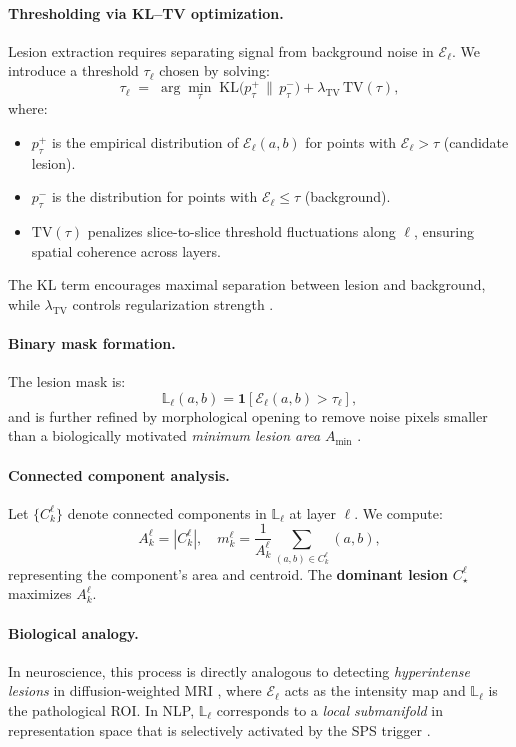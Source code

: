 \documentclass[11pt]{article}
\begin{document}
\paragraph{Thresholding via KL–TV optimization.}
Lesion extraction requires separating signal from background noise in $\mathcal{E}_\ell$.  
We introduce a threshold $\tau_\ell$ chosen by solving:
\[
\tau_\ell \;=\; \arg\min_{\tau} \; \mathrm{KL}\big(p^+_\tau \,\|\, p^-_\tau\big) + \lambda_{\mathrm{TV}}\, \mathrm{TV}(\tau),
\]
where:
\begin{itemize}
    \item $p^+_\tau$ is the empirical distribution of $\mathcal{E}_\ell(a,b)$ for points with $\mathcal{E}_\ell > \tau$ (candidate lesion).
    \item $p^-_\tau$ is the distribution for points with $\mathcal{E}_\ell \leq \tau$ (background).
    \item $\mathrm{TV}(\tau)$ penalizes slice-to-slice threshold fluctuations along $\ell$, ensuring spatial coherence across layers.
\end{itemize}
The KL term encourages maximal separation between lesion and background, while $\lambda_{\mathrm{TV}}$ controls regularization strength \citep{rudin1992nonlinear, ashburner2005unified}.

\paragraph{Binary mask formation.}
The lesion mask is:
\[
\mathbb{L}_\ell(a,b) = \mathbf{1}[\mathcal{E}_\ell(a,b) > \tau_\ell],
\]
and is further refined by morphological opening to remove noise pixels smaller than a biologically motivated \textit{minimum lesion area} $A_{\mathrm{min}}$ \citep{garcia2005mechanisms}.

\paragraph{Connected component analysis.}
Let $\{C_k^\ell\}$ denote connected components in $\mathbb{L}_\ell$ at layer $\ell$.  
We compute:
\[
A_k^\ell = |C_k^\ell|, \quad m_k^\ell = \frac{1}{A_k^\ell} \sum_{(a,b) \in C_k^\ell} (a,b),
\]
representing the component's area and centroid.  
The \textbf{dominant lesion} $C_\star^\ell$ maximizes $A_k^\ell$.

\paragraph{Biological analogy.}
In neuroscience, this process is directly analogous to detecting \textit{hyperintense lesions} in diffusion-weighted MRI \citep{basser1994mr}, where $\mathcal{E}_\ell$ acts as the intensity map and $\mathbb{L}_\ell$ is the pathological ROI.  
In NLP, $\mathbb{L}_\ell$ corresponds to a \emph{local submanifold} in representation space that is selectively activated by the SPS trigger \citep{wallace2019universal, jiang2020can}.
\end{document}
